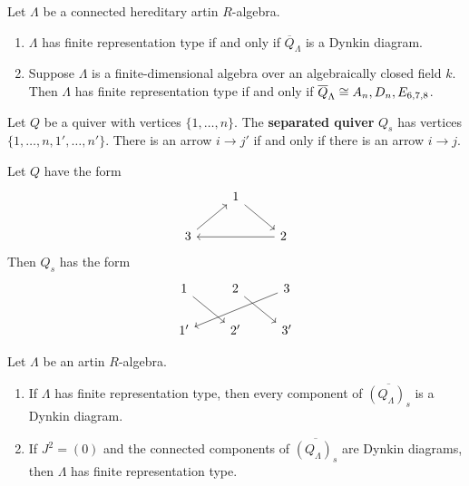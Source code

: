 \begin{theorem}\label{3.5.5}
Let $\Lambda$ be a connected hereditary artin $R$-algebra.
\begin{enumerate}
\item $\Lambda$ has finite representation type if and only if $\overline Q_\Lambda$ is a
Dynkin diagram.
\item Suppose $\Lambda$ is a finite-dimensional algebra over an algebraically closed
field $k$.
Then $\Lambda$ has finite representation type if and only if $\overline Q_\Lambda \cong A_n,
D_n, E_{6,7,8}$.
\end{enumerate}
\end{theorem}


\begin{definition}
Let $Q$ be a quiver with vertices $\{1, \ldots, n\}$. The \textbf{separated quiver}
$Q_s$ has vertices $\{1, \ldots, n, 1', \ldots, n'\}$. There is an arrow $i \to j'$ if and
only if there is an arrow $i \to j$.
\end{definition}


\begin{example}
Let $Q$ have the form 
\[
\begin{tikzcd}%
          & 1 \ar[dr] & \\
3 \ar[ur] &           & 2 \ar[ll] 
\end{tikzcd}
\]
Then $Q_s$ has the form
\[
\begin{tikzcd}
1 \drar & 2\drar & 3\ar[dll]\\
1' & 2' & 3'
\end{tikzcd}
\]
\end{example}


\begin{theorem}\label{3.5.6}
Let $\Lambda$ be an artin $R$-algebra.
\begin{enumerate}
\item If $\Lambda$ has finite representation type, then every component of
$\overline{(Q_\Lambda)_s}$ is a Dynkin diagram.
\item If $J^2 = (0)$ and the connected components of $\overline{(Q_\Lambda)_s}$
are Dynkin diagrams, then $\Lambda$ has finite representation type.
\end{enumerate}
\end{theorem}

